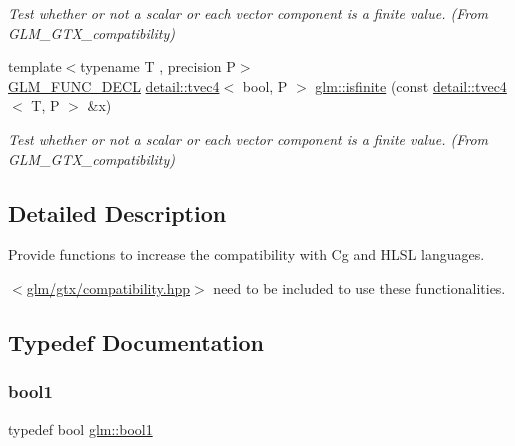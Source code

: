 \begin{DoxyCompactItemize}
\begin{DoxyCompactList}\small\item\em Test whether or not a scalar or each vector component is a finite value. (From G\+L\+M\+\_\+\+G\+T\+X\+\_\+compatibility) \end{DoxyCompactList}\item 
{\footnotesize template$<$typename T , precision P$>$ }\\\hyperlink{setup_8hpp_ab2d052de21a70539923e9bcbf6e83a51}{G\+L\+M\+\_\+\+F\+U\+N\+C\+\_\+\+D\+E\+CL} \hyperlink{structglm_1_1detail_1_1tvec4}{detail\+::tvec4}$<$ bool, P $>$ \hyperlink{group__gtx__compatibility_gab256d4b6eaa066847d0629d6dde1dcba}{glm\+::isfinite} (const \hyperlink{structglm_1_1detail_1_1tvec4}{detail\+::tvec4}$<$ T, P $>$ \&x)
\begin{DoxyCompactList}\small\item\em Test whether or not a scalar or each vector component is a finite value. (From G\+L\+M\+\_\+\+G\+T\+X\+\_\+compatibility) \end{DoxyCompactList}\end{DoxyCompactItemize}


\subsection{Detailed Description}
Provide functions to increase the compatibility with Cg and H\+L\+SL languages. 

$<$\hyperlink{compatibility_8hpp}{glm/gtx/compatibility.\+hpp}$>$ need to be included to use these functionalities. 

\subsection{Typedef Documentation}
\mbox{\label{group__gtx__compatibility_gab65f19f5170f95a2f06d6aa6482c9405}} 
\subsubsection{\texorpdfstring{bool1}{bool1}}
{\footnotesize\ttfamily typedef bool \hyperlink{group__gtx__compatibility_gab65f19f5170f95a2f06d6aa6482c9405}{glm\+::bool1}}



